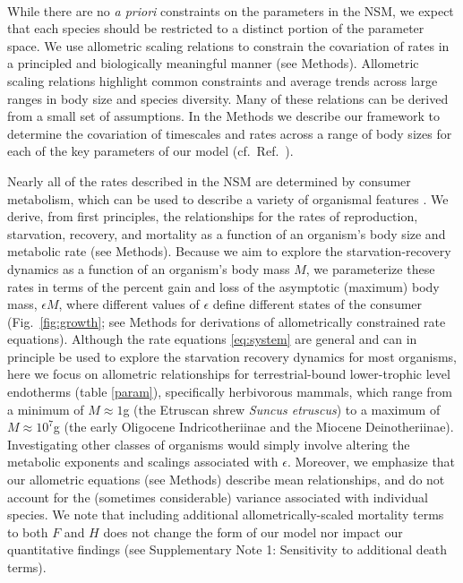 \documentclass[twocolumn,preprintnumbers,amsmath,amssymb,superscriptaddress]{revtex4}
\begin{document}

\\
While there
are no {\it a priori} constraints on the parameters in the NSM, we expect
that each species should be restricted to a distinct portion of the parameter
space.  We use allometric scaling relations to constrain the covariation of
rates in a principled and biologically meaningful manner (see Methods).
Allometric scaling relations highlight common constraints and average trends
across large ranges in body size and species diversity. Many of these
relations can be derived from a small set of assumptions.  In the Methods we
describe our framework to determine the covariation of timescales and rates
across a range of body sizes for each of the key parameters of our model
(cf.\ Ref.~\citep{Yodzis:1992hg}).

Nearly all of the rates described in the NSM are determined by consumer
metabolism, which can be used to describe a variety of organismal features
\citep{Brown:2004wq}.  We derive, from first principles, the relationships
for the rates of reproduction, starvation, recovery, and mortality as a
function of an organism's body size and metabolic rate (see Methods).
Because we aim to explore the starvation-recovery dynamics as a function of
an organism's body mass $M$, we parameterize these rates in terms of the
percent gain and loss of the asymptotic (maximum) body mass,
$\epsilon M$, where different values of $\epsilon$ define different states of
the consumer (Fig.~\ref{fig:growth}; see Methods for derivations of
allometrically constrained rate equations).  Although the rate equations
\eqref{eq:system} are general and can in principle be used to explore the
starvation recovery dynamics for most organisms, here we focus on allometric
relationships for terrestrial-bound lower-trophic level endotherms (table \ref{param}), specifically herbivorous mammals, which range from a minimum
of $M\approx1$g (the Etruscan shrew \emph{Suncus etruscus}) to a maximum of
$M\approx10^7$g (the early Oligocene Indricotheriinae and the Miocene
Deinotheriinae).  Investigating other classes of organisms would simply
involve altering the metabolic exponents and scalings associated with
$\epsilon$. Moreover, we emphasize that our allometric equations (see
Methods) describe mean relationships, and do not account for the (sometimes
considerable) variance associated with individual species.  We note that
including additional allometrically-scaled mortality terms to both $F$ and
$H$ does not change the form of our model nor impact our quantitative findings
(see Supplementary Note 1: Sensitivity to additional death terms).
\end{document}
